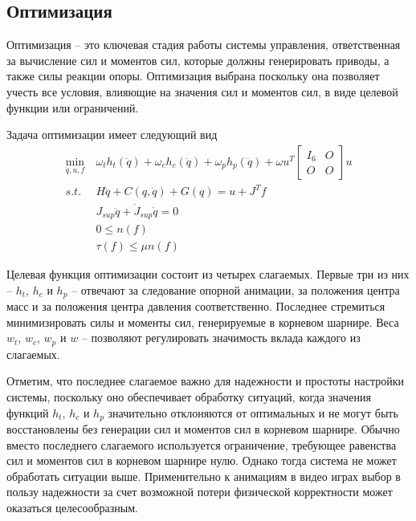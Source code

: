 \subsection{Оптимизация}

Оптимизация -- это ключевая стадия работы системы управления, ответственная за вычисление сил и моментов сил, которые должны генерировать приводы, а также силы реакции опоры. Оптимизация выбрана поскольку она позволяет учесть все условия, влияющие на значения сил и моментов сил, в виде целевой функции или ограничений.

Задача оптимизации имеет следующий вид
\begin{align*}
  \min_{\ddot{q}, u, f} &\ \omega_{t} h_{t}(\ddot{q}) + \omega_{c} h_{c}(\ddot{q}) + \omega_{p} h_{p}(\ddot{q}) + \omega u^{T} \begin{bmatrix} I_{6} & O \\ O & O \end{bmatrix} u \\
  s.t. &\ H \ddot{q} + C(q, \dot{q}) + G(q) = u + J^{T} f \tag{2.1}\label{eq:2.1} \\
       &\ J_{sup} \ddot{q} + \dot{J}_{sup} \dot{q} = 0 \tag{2.2}\label{eq:2.2} \\
       &\ 0 \le n(f) \tag{2.3}\label{ineq:2.3} \\
       &\ \tau(f) \le \mu n(f) \tag{2.4}\label{ineq:2.4}
\end{align*}

Целевая функция оптимизации состоит из четырех слагаемых. Первые три из них -- $h_{t}$, $h_{c}$ и $h_{p}$ -- отвечают за следование опорной анимации, за положения центра масс и за положения центра давления соответственно. Последнее стремиться минимизировать силы и моменты сил, генерируемые в корневом шарнире. Веса $w_{t}$, $w_{c}$, $w_{p}$ и $w$ -- позволяют регулировать значимость вклада каждого из слагаемых.

Отметим, что последнее слагаемое важно для надежности и простоты настройки системы, поскольку оно обеспечивает обработку ситуаций, когда значения функций $h_{t}$, $h_{c}$ и $h_{p}$ значительно отклоняются от оптимальных и не могут быть восстановлены без генерации сил и моментов сил в корневом шарнире. Обычно вместо последнего слагаемого используется ограничение, требующее равенства сил и моментов сил в корневом шарнире нулю. Однако тогда система не может обработать ситуации выше. Применительно к анимациям в видео играх выбор в пользу надежности за счет возможной потери физической корректности может оказаться целесообразным.

